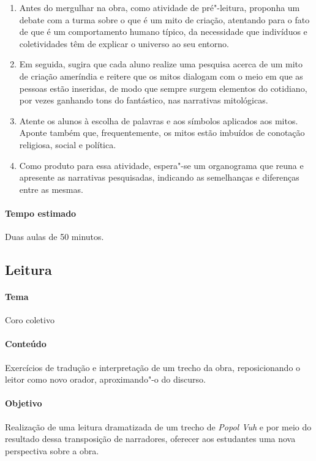 \documentclass[12pt]{extarticle}
\begin{document}
\begin{enumerate}
\item
Antes do mergulhar na obra, como atividade de pré"-leitura, proponha um debate 
com a turma sobre o que é um mito de criação, atentando para o fato de que é um 
comportamento humano típico, da necessidade que indivíduos e coletividades têm de
explicar o universo ao seu entorno.

\item
Em seguida, sugira que cada aluno realize uma pesquisa acerca de um mito de criação ameríndia 
e reitere que os mitos dialogam com o meio em que as pessoas estão 
inseridas, de modo que sempre surgem elementos do cotidiano, por vezes 
ganhando tons do fantástico, nas narrativas mitológicas.

\item
Atente os alunos à escolha de palavras e aos símbolos aplicados 
aos mitos. Aponte também que, frequentemente, os mitos estão imbuídos de conotação 
religiosa, social e política.

\item
Como produto para essa atividade, espera"-se um organograma que reuna e 
apresente as narrativas pesquisadas, indicando as semelhanças e diferenças
entre as mesmas.

\end{enumerate}

\paragraph{Tempo estimado} Duas aulas de 50 minutos. 

\subsection{Leitura}

\paragraph{Tema} Coro coletivo

\paragraph{Conteúdo} Exercícios de tradução e interpretação de um trecho da obra, 
reposicionando o leitor como novo orador, aproximando"-o do discurso.

\paragraph{Objetivo} Realização de uma leitura dramatizada de um trecho de \emph{Popol Vuh} 
e por meio do resultado dessa transposição de narradores, oferecer aos estudantes 
uma nova perspectiva sobre a obra. 
\end{document}
